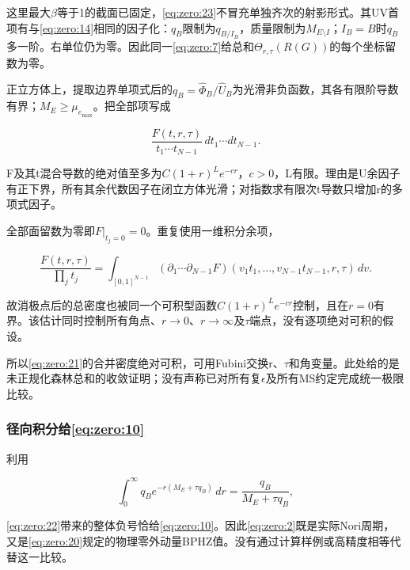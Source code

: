 \documentclass[11pt,a4paper,oneside]{ctexart}
\theoremstyle{cnplain}
\theoremstyle{definition}
\theoremstyle{remark}
\numberwithin{equation}{section}
\begin{document}
这里最大\(\beta \)等于1的截面已固定，\eqref{eq:zero:23}不冒充单独齐次的射影形式。其UV首项有与\eqref{eq:zero:14}相同的因子化：\(q_B\)限制为\(q_{B/I_B}\)，质量限制为\(M_{E\setminus I}\)；\(I_B=B\)时\(q_B\)多一阶。右单位仍为零。因此同一\eqref{eq:zero:7}给总和\(\Theta _{r,\tau }(R(G))\)的每个坐标留数为零。

正立方体上，提取边界单项式后的\(q_B=\widehat\Phi _B/\widehat U_B\)为光滑非负函数，其各有限阶导数有界；\(M_E\ge \mu _{e_{\mathrm{max}}}\)。把全部项写成

\begin{equation}
\frac{F(t,r,\tau)}{t_1\cdots t_{N-1}}\,
                      dt_1\cdots dt_{N-1}.
\end{equation}

F及其t混合导数的绝对值至多为\(C(1+r)^L e^{-cr}\)，\(c>0\)，L有限。理由是U余因子有正下界，所有其余代数因子在闭立方体光滑；对指数求有限次t导数只增加r的多项式因子。

全部面留数为零即\(F|_{t_j=0}=0\)。重复使用一维积分余项，

\begin{equation}
\frac{F(t,r,\tau)}{\prod_jt_j}
 =\int_{[0,1]^{N-1}}
   (\partial_1\cdots\partial_{N-1}F)
              (v_1t_1,\ldots,v_{N-1}t_{N-1},r,\tau)\,dv.     \label{eq:zero:24}
\end{equation}

故消极点后的总密度也被同一个可积型函数\(C(1+r)^L e^{-cr}\)控制，且在\(r=0\)有界。该估计同时控制所有角点、\(r\to 0\)、\(r\to \infty \)及\(\tau \)端点，没有逐项绝对可积的假设。

所以\eqref{eq:zero:21}的合并密度绝对可积，可用Fubini交换r、\(\tau \)和角变量。此处给的是未正规化森林总和的收敛证明；没有声称已对所有复\(\epsilon \)及所有MS约定完成统一极限比较。

\subsubsection{\texorpdfstring{径向积分给\eqref{eq:zero:10}}{径向积分给}}\label{sec:zero:8.3}

利用

\begin{equation}
\int_0^\infty q_Be^{-r(M_E+\tau q_B)}\,dr
                           =\frac{q_B}{M_E+\tau q_B},         \label{eq:zero:25}
\end{equation}

\eqref{eq:zero:22}带来的整体负号恰给\eqref{eq:zero:10}。因此\eqref{eq:zero:2}既是实际Nori周期，又是\eqref{eq:zero:20}规定的物理零外动量BPHZ值。没有通过计算样例或高精度相等代替这一比较。
\end{document}

